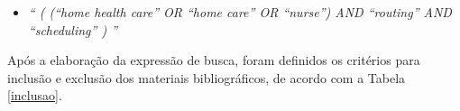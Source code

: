 \begin{itemize}
\item \textit{`` ( (``home health care'' OR ``home care'' OR ``nurse'') AND ``routing'' AND ``scheduling'' ) ''}
\end{itemize}

Após a elaboração da expressão de busca, foram definidos os critérios para inclusão e exclusão dos materiais bibliográficos, de acordo com a Tabela \ref{inclusao}.




